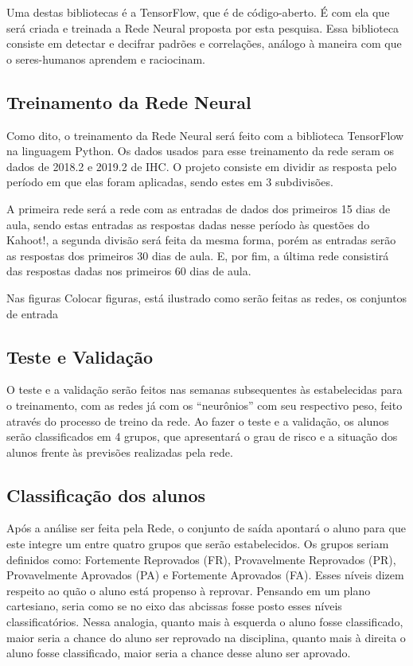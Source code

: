 \documentclass[
	12pt,				%
	openright,			%
	oneside,
	a4paper,			%
	english,			%
	french,				%
	spanish,			%
	brazil,				%
	]{abntex2}
\begin{document}
Uma destas bibliotecas é a TensorFlow, que é de código-aberto. É com ela que será criada e treinada a Rede Neural proposta por esta pesquisa. Essa biblioteca consiste em detectar e decifrar padrões e correlações, análogo à maneira com que o seres-humanos aprendem e raciocinam.

\subsection{Treinamento da Rede Neural}

Como dito, o treinamento da Rede Neural será feito com a biblioteca TensorFlow na linguagem Python. Os dados usados para esse treinamento da rede seram os dados de 2018.2 e 2019.2 de IHC. O projeto consiste em dividir as resposta pelo período em que elas foram aplicadas, sendo estes em 3 subdivisões.

A primeira rede será a rede com as entradas de dados dos primeiros 15 dias de aula, sendo estas entradas as respostas dadas nesse período às questões do Kahoot!, a segunda divisão será feita da mesma forma, porém as entradas serão as respostas dos primeiros 30 dias de aula. E, por fim, a última rede consistirá das respostas dadas nos primeiros 60 dias de aula.

Nas figuras {\color{red}Colocar figuras}, está ilustrado como serão feitas as redes, os conjuntos de entrada 

\subsection{Teste e Validação}

O teste e a validação serão feitos nas semanas subsequentes às estabelecidas para o treinamento, com as redes já com os ``neurônios'' com seu respectivo peso, feito através do processo de treino da rede. Ao fazer o teste e a validação, os alunos serão classificados em 4 grupos, que apresentará o grau de risco e a situação dos alunos frente às previsões realizadas pela rede.

\subsection{Classificação dos alunos}
Após a análise ser feita pela Rede, o conjunto de saída apontará o aluno para que este integre um entre quatro grupos que serão estabelecidos. Os grupos seriam definidos como: Fortemente Reprovados (FR), Provavelmente Reprovados (PR), Provavelmente Aprovados (PA) e Fortemente Aprovados (FA). Esses níveis dizem respeito ao quão o aluno está propenso à reprovar. Pensando em um plano cartesiano, seria como se no eixo das abcissas fosse posto esses níveis classificatórios. Nessa analogia, quanto mais à esquerda o aluno fosse classificado, maior seria a chance do aluno ser reprovado na disciplina, quanto mais à direita o aluno fosse classificado, maior seria a chance desse aluno ser aprovado.
\end{document}
